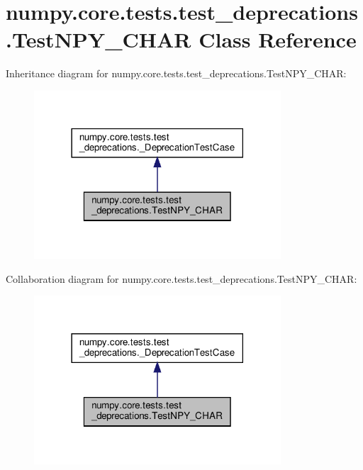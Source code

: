 \hypertarget{classnumpy_1_1core_1_1tests_1_1test__deprecations_1_1TestNPY__CHAR}{}\section{numpy.\+core.\+tests.\+test\+\_\+deprecations.\+Test\+N\+P\+Y\+\_\+\+C\+H\+AR Class Reference}
\label{classnumpy_1_1core_1_1tests_1_1test__deprecations_1_1TestNPY__CHAR}


Inheritance diagram for numpy.\+core.\+tests.\+test\+\_\+deprecations.\+Test\+N\+P\+Y\+\_\+\+C\+H\+AR\+:
\nopagebreak
\begin{figure}[H]
\begin{center}
\leavevmode
\includegraphics[width=261pt]{classnumpy_1_1core_1_1tests_1_1test__deprecations_1_1TestNPY__CHAR__inherit__graph}
\end{center}
\end{figure}


Collaboration diagram for numpy.\+core.\+tests.\+test\+\_\+deprecations.\+Test\+N\+P\+Y\+\_\+\+C\+H\+AR\+:
\nopagebreak
\begin{figure}[H]
\begin{center}
\leavevmode
\includegraphics[width=261pt]{classnumpy_1_1core_1_1tests_1_1test__deprecations_1_1TestNPY__CHAR__coll__graph}
\end{center}
\end{figure}
